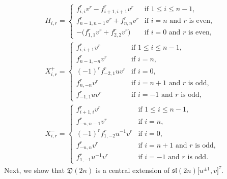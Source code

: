 \documentclass[pdftex]{sigma}
\numberwithin{equation}{section}
\theoremstyle{definition}
\begin{document}
\begin{gather*}
H_{i,r}=\begin{cases}
f^r_{i,i}v^r-f^r_{i+1,i+1}v^r&\text{if }1\leq i\leq n-1,\\
f^r_{n-1,n-1}v^r+f^r_{n,n}v^r&\text{if }i=n\text{ and $r$ is even},\\
-\bigl(f^r_{1,1}v^r+f^r_{2,2}v^r\bigr)&\text{if }i=0\text{ and $r$ is even},
\end{cases}\\
X^+_{i,r}=\begin{cases}
f^r_{i,i+1}v^r&\text{if }1\leq i\leq n-1,\\
f^r_{n-1,-n}v^r&\text{if }i=n,\\
(-1)^rf^r_{-2,1}uv^r&\text{if }i=0,\\
f^r_{n,-n}v^r&\text{if }i=n+1\text{ and $r$ is odd},\\
f^r_{-1,1}uv^r&\text{if }i=-1\text{ and $r$ is odd},
\end{cases}\\
X^-_{i,r}=\begin{cases}
f^r_{i+1,i}v^r&\text{if }1\leq i\leq n-1,\\
f^r_{-n,n-1}v^r&\text{if }i=n,\\
(-1)^rf^r_{1,-2}u^{-1}v^r&\text{if }i=0,\\
f^r_{-n,n}v^r&\text{if }i=n+1\text{ and $r$ is odd},\\
f^r_{1,-1}u^{-1}v^r&\text{if }i=-1\text{ and $r$ is odd}.
\end{cases}
\end{gather*}
Next, we show that $\mathfrak{D}(2n)$ is a central extension of $\mathfrak{sl}(2n)\bigl[u^{\pm1},v\bigr]^\tau$.
\end{document}
